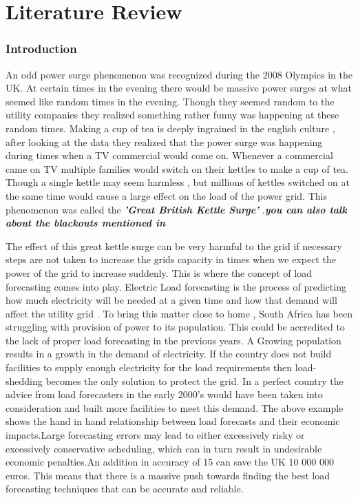 

\chapter{Literature Review}
\subsection{Introduction}
An odd power surge phenomenon was recognized during the 2008 Olympics in the UK. At certain times in  the evening there would be massive power surges at what seemed like random times in the evening. Though they seemed random to the utility companies they realized something rather funny was happening at these random times. Making a cup of tea is deeply ingrained in the english culture , after looking at the data they realized that the power surge was happening during times when a TV commercial would come on. Whenever a commercial came on TV multiple families would switch on their kettles to make a cup of tea. Though a single kettle may seem harmless  , but millions of kettles switched on at the same time would cause a large effect on the load of the power grid. This phenomenon was called the \textbf{\textit{'Great British Kettle Surge'}} \cite{kettle_surge}.\textit{\textbf{you can also talk about the blackouts mentioned in \cite{li2023ultra}}}

The effect of this great kettle surge can be very harmful to the grid if necessary steps are not taken to increase the grids capacity in times when we expect the power of the grid to increase suddenly. This is where the concept of load forecasting comes into play.
Electric Load forecasting is the process of predicting how much electricity will be needed at a given time and how that demand will affect the utility grid \cite{IBM_loadforecasting}. To bring this matter close to home , South Africa has been struggling with provision of power to its population. This could be accredited to the lack of proper load forecasting in the previous years. A Growing population results in a growth in the demand of electricity. If the country does not build facilities to supply enough electricity for the load requirements then  load-shedding becomes the only solution to protect the grid. In a perfect country the advice from load forecasters in the early 2000's would have been taken into consideration and built more facilities to meet this demand.
The above example shows the hand in hand relationship between load forecasts and their economic impacts.Large forecasting errors may lead to either excessively risky or excessively conservative
scheduling, which can in turn result in undesirable economic penalties\cite{festas2001computational}.An addition in accuracy of 15 can save the UK 10 000 000 euros\cite{gochhait2023regression}. This means that there is a massive push towards finding the best load forecasting techniques that can be accurate and reliable.

